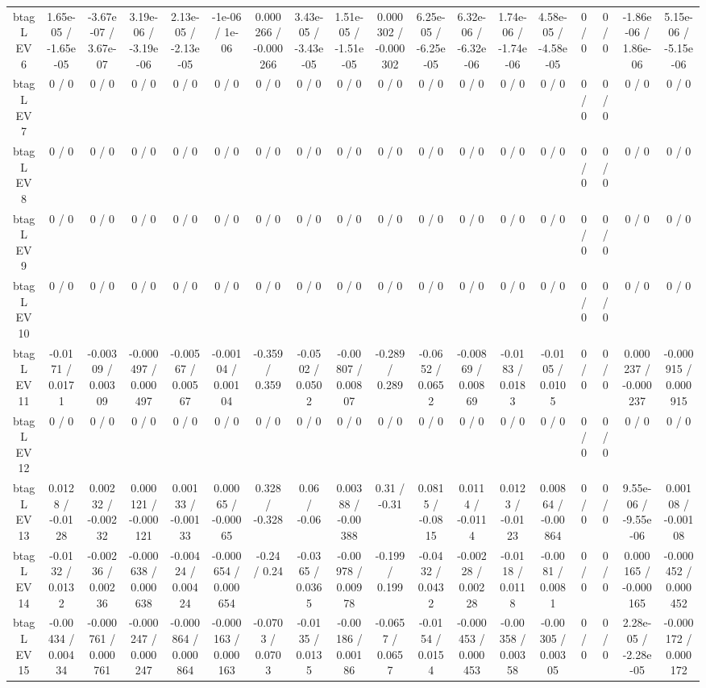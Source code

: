 \documentclass[10pt]{article}
\begin{document}
\begin{table}[htbp]
\begin{center}
\begin{tabular}{|c|c|c|c|c|c|c|c|c|c|c|c|c|c|c|c|c|c|}
  btag L EV 6 & 1.65e-05 / -1.65e-05 & -3.67e-07 / 3.67e-07 & 3.19e-06 / -3.19e-06 & 2.13e-05 / -2.13e-05 & -1e-06 / 1e-06 & 0.000266 / -0.000266 & 3.43e-05 / -3.43e-05 & 1.51e-05 / -1.51e-05 & 0.000302 / -0.000302 & 6.25e-05 / -6.25e-05 & 6.32e-06 / -6.32e-06 & 1.74e-06 / -1.74e-06 & 4.58e-05 / -4.58e-05 & 0 / 0 & 0 / 0 & -1.86e-06 / 1.86e-06 & 5.15e-06 / -5.15e-06 \\ 
  btag L EV 7 & 0 / 0 & 0 / 0 & 0 / 0 & 0 / 0 & 0 / 0 & 0 / 0 & 0 / 0 & 0 / 0 & 0 / 0 & 0 / 0 & 0 / 0 & 0 / 0 & 0 / 0 & 0 / 0 & 0 / 0 & 0 / 0 & 0 / 0 \\ 
  btag L EV 8 & 0 / 0 & 0 / 0 & 0 / 0 & 0 / 0 & 0 / 0 & 0 / 0 & 0 / 0 & 0 / 0 & 0 / 0 & 0 / 0 & 0 / 0 & 0 / 0 & 0 / 0 & 0 / 0 & 0 / 0 & 0 / 0 & 0 / 0 \\ 
  btag L EV 9 & 0 / 0 & 0 / 0 & 0 / 0 & 0 / 0 & 0 / 0 & 0 / 0 & 0 / 0 & 0 / 0 & 0 / 0 & 0 / 0 & 0 / 0 & 0 / 0 & 0 / 0 & 0 / 0 & 0 / 0 & 0 / 0 & 0 / 0 \\ 
  btag L EV 10 & 0 / 0 & 0 / 0 & 0 / 0 & 0 / 0 & 0 / 0 & 0 / 0 & 0 / 0 & 0 / 0 & 0 / 0 & 0 / 0 & 0 / 0 & 0 / 0 & 0 / 0 & 0 / 0 & 0 / 0 & 0 / 0 & 0 / 0 \\ 
  btag L EV 11 & -0.0171 / 0.0171 & -0.00309 / 0.00309 & -0.000497 / 0.000497 & -0.00567 / 0.00567 & -0.00104 / 0.00104 & -0.359 / 0.359 & -0.0502 / 0.0502 & -0.00807 / 0.00807 & -0.289 / 0.289 & -0.0652 / 0.0652 & -0.00869 / 0.00869 & -0.0183 / 0.0183 & -0.0105 / 0.0105 & 0 / 0 & 0 / 0 & 0.000237 / -0.000237 & -0.000915 / 0.000915 \\ 
  btag L EV 12 & 0 / 0 & 0 / 0 & 0 / 0 & 0 / 0 & 0 / 0 & 0 / 0 & 0 / 0 & 0 / 0 & 0 / 0 & 0 / 0 & 0 / 0 & 0 / 0 & 0 / 0 & 0 / 0 & 0 / 0 & 0 / 0 & 0 / 0 \\ 
  btag L EV 13 & 0.0128 / -0.0128 & 0.00232 / -0.00232 & 0.000121 / -0.000121 & 0.00133 / -0.00133 & 0.00065 / -0.00065 & 0.328 / -0.328 & 0.06 / -0.06 & 0.00388 / -0.00388 & 0.31 / -0.31 & 0.0815 / -0.0815 & 0.0114 / -0.0114 & 0.0123 / -0.0123 & 0.00864 / -0.00864 & 0 / 0 & 0 / 0 & 9.55e-06 / -9.55e-06 & 0.00108 / -0.00108 \\ 
  btag L EV 14 & -0.0132 / 0.0132 & -0.00236 / 0.00236 & -0.000638 / 0.000638 & -0.00424 / 0.00424 & -0.000654 / 0.000654 & -0.24 / 0.24 & -0.0365 / 0.0365 & -0.00978 / 0.00978 & -0.199 / 0.199 & -0.0432 / 0.0432 & -0.00228 / 0.00228 & -0.0118 / 0.0118 & -0.0081 / 0.0081 & 0 / 0 & 0 / 0 & 0.000165 / -0.000165 & -0.000452 / 0.000452 \\ 
  btag L EV 15 & -0.00434 / 0.00434 & -0.000761 / 0.000761 & -0.000247 / 0.000247 & -0.000864 / 0.000864 & -0.000163 / 0.000163 & -0.0703 / 0.0703 & -0.0135 / 0.0135 & -0.00186 / 0.00186 & -0.0657 / 0.0657 & -0.0154 / 0.0154 & -0.000453 / 0.000453 & -0.00358 / 0.00358 & -0.00305 / 0.00305 & 0 / 0 & 0 / 0 & 2.28e-05 / -2.28e-05 & -0.000172 / 0.000172 \\ 

\end{tabular}
\end{center}
\end{table}
\end{document}
